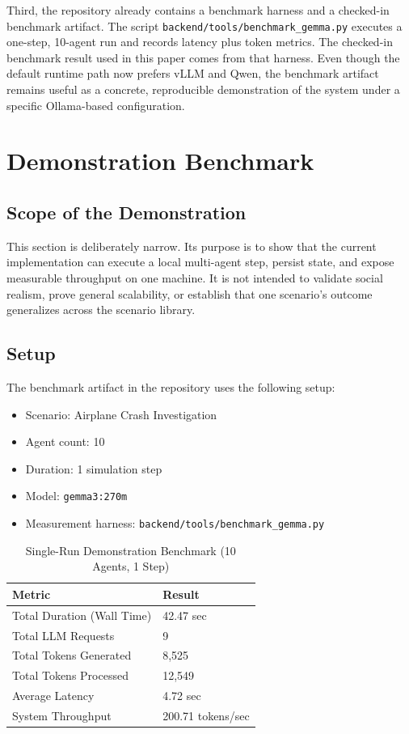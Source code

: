 \documentclass{article}
\begin{document}
Third, the repository already contains a benchmark harness and a checked-in benchmark artifact. The script \texttt{backend/tools/benchmark\_gemma.py} executes a one-step, 10-agent run and records latency plus token metrics. The checked-in benchmark result used in this paper comes from that harness. Even though the default runtime path now prefers vLLM and Qwen, the benchmark artifact remains useful as a concrete, reproducible demonstration of the system under a specific Ollama-based configuration.

\section{Demonstration Benchmark}
\subsection{Scope of the Demonstration}
This section is deliberately narrow. Its purpose is to show that the current implementation can execute a local multi-agent step, persist state, and expose measurable throughput on one machine. It is not intended to validate social realism, prove general scalability, or establish that one scenario's outcome generalizes across the scenario library.

\subsection{Setup}
The benchmark artifact in the repository uses the following setup:

\begin{itemize}
    \item Scenario: Airplane Crash Investigation
    \item Agent count: 10
    \item Duration: 1 simulation step
    \item Model: \texttt{gemma3:270m}
    \item Measurement harness: \texttt{backend/tools/benchmark\_gemma.py}
\end{itemize}

\begin{table}[h]
 \caption{Single-Run Demonstration Benchmark (10 Agents, 1 Step)}
 \centering
 \begin{tabular}{ll}
 \toprule
 Metric & Result \\
 \midrule
 Total Duration (Wall Time) & 42.47 sec \\
 Total LLM Requests & 9 \\
 Total Tokens Generated & 8,525 \\
 Total Tokens Processed & 12,549 \\
 Average Latency & 4.72 sec \\
 System Throughput & 200.71 tokens/sec \\
 \bottomrule
 \end{tabular}
 \label{tab:benchmarks}
\end{table}
\end{document}
